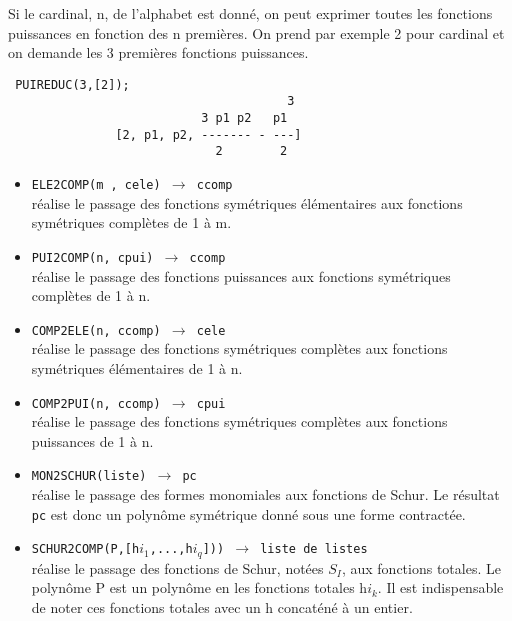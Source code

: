 \documentclass[11pt]{article}
\begin{document}
Si le cardinal, n, de l'alphabet est donn\'{e}, on peut
exprimer toutes les fonctions puissances en fonction des n premi\`{e}res.
On prend par exemple 2 pour cardinal et on demande les 3 premi\`{e}res
fonctions puissances.
\small
\begin{verbatim}
 PUIREDUC(3,[2]);
                                       3
                           3 p1 p2   p1
               [2, p1, p2, ------- - ---]
                             2        2

\end{verbatim}
\normalsize
\begin{itemize}
\item {\tt ELE2COMP(m , cele) 
 $\longrightarrow$ ccomp}\\
 r\'{e}alise le passage des fonctions 
sym\'{e}triques 
\'{e}l\'{e}mentaires aux fonctions sym\'etriques compl\`etes de 1 \`{a} m.
\item {\tt PUI2COMP(n, cpui) 
$\longrightarrow$ ccomp}\\
 r\'{e}alise le passage des fonctions 
puissances aux fonctions 
sym\'{e}triques compl\`etes de 1 \`{a} n.
\item {\tt COMP2ELE(n, ccomp) 
$\longrightarrow$ cele}\\
 r\'{e}alise le passage des fonctions sym\'etriques
compl\`etes aux fonctions 
sym\'{e}triques \'{e}l\'{e}mentaires de 1 \`{a} n.
\item {\tt COMP2PUI(n, ccomp)
 $\longrightarrow$ cpui}\\
 r\'{e}alise le passage des fonctions sym\'etriques
compl\`etes aux fonctions 
puissances de 1 \`{a} n.
\item {\tt MON2SCHUR(liste) 
$\longrightarrow$ pc}\\
r\'ealise le passage des formes monomiales aux fonctions de Schur. Le
r\'esultat {\tt pc} est donc un polyn\^ome sym\'etrique donn\'e sous
une forme contract\'ee.

\item {\tt SCHUR2COMP(P,[h$i_{1}$,...,h$i_{q}$]))
$\longrightarrow$ liste de listes}\\
r\'ealise le passage des fonctions de Schur, not\'ees $S_{I}$,
aux fonctions totales. Le polyn\^ome P est un polyn\^ome en les fonctions
totales h$i_{k}$. Il est indispensable de noter ces fonctions totales
avec un h concat\'en\'e \`a un entier.

\end{itemize}
\end{document}

